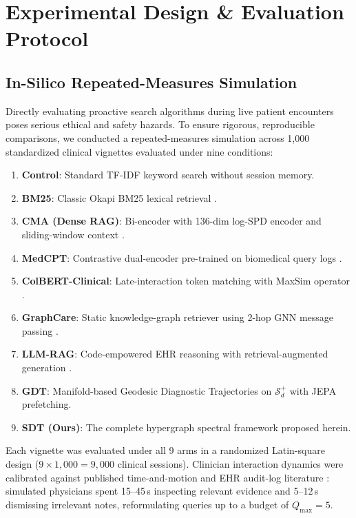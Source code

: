 \documentclass[10pt, onecolumn]{article}
\begin{document}
\section{Experimental Design \& Evaluation Protocol}
\label{sec:experiments}

\subsection{In-Silico Repeated-Measures Simulation}
Directly evaluating proactive search algorithms during live patient encounters poses serious ethical and safety hazards. To ensure rigorous, reproducible comparisons, we conducted a repeated-measures simulation across 1{,}000 standardized clinical vignettes evaluated under nine conditions:
\begin{enumerate}[(1)]
  \item \textbf{Control}: Standard TF-IDF keyword search without session memory.
  \item \textbf{BM25}: Classic Okapi BM25 lexical retrieval \cite{baeza1999modern}.
  \item \textbf{CMA (Dense RAG)}: Bi-encoder with 136-dim log-SPD encoder and sliding-window context \cite{lewis2020retrieval}.
  \item \textbf{MedCPT}: Contrastive dual-encoder pre-trained on biomedical query logs \cite{jin2023medcpt}.
  \item \textbf{ColBERT-Clinical}: Late-interaction token matching with MaxSim operator \cite{santhanam2022colbertv2}.
  \item \textbf{GraphCare}: Static knowledge-graph retriever using 2-hop GNN message passing \cite{jiang2024graphcare}.
  \item \textbf{LLM-RAG}: Code-empowered EHR reasoning with retrieval-augmented generation \cite{eickhoff2024ehrrag}.
  \item \textbf{GDT}: Manifold-based Geodesic Diagnostic Trajectories on $\mathcal{S}_d^+$ with JEPA prefetching.
  \item \textbf{SDT (Ours)}: The complete hypergraph spectral framework proposed herein.
\end{enumerate}
Each vignette was evaluated under all 9 arms in a randomized Latin-square design ($9 \times 1{,}000 = 9{,}000$ clinical sessions). Clinician interaction dynamics were calibrated against published time-and-motion and EHR audit-log literature \cite{sinsky2016allocation,zheng2021analyzing}: simulated physicians spent 15--45\,s inspecting relevant evidence and 5--12\,s dismissing irrelevant notes, reformulating queries up to a budget of $Q_{\max} = 5$.
\end{document}
